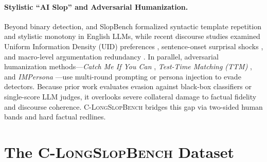 \documentclass[11pt]{article}
\newcommand{\bench}{\textsc{C-LongSlopBench}}
\begin{document}
\paragraph{Stylistic ``AI Slop'' and Adversarial Humanization.}
Beyond binary detection, \citet{shaib2024syntactic} and SlopBench \cite{slopbench2026} formalized syntactic template repetition and stylistic monotony in English LLMs, while recent discourse studies examined Uniform Information Density (UID) preferences \cite{uidpo2026}, sentence-onset surprisal shocks \cite{nyusurprisal2026}, and macro-level argumentation redundancy \cite{scislop2026}. In parallel, adversarial humanization methods---\textit{Catch Me If You Can} \cite{catchme2025}, \textit{Test-Time Matching (TTM)} \cite{ttm2025}, and \textit{IMPersona} \cite{impersona2025}---use multi-round prompting or persona injection to evade detectors. Because prior work evaluates evasion against black-box classifiers or single-score LLM judges, it overlooks severe collateral damage to factual fidelity and discourse coherence. \bench{} bridges this gap via two-sided human bands and hard factual redlines.

\section{The \bench{} Dataset}
\label{sec:dataset}
\end{document}
